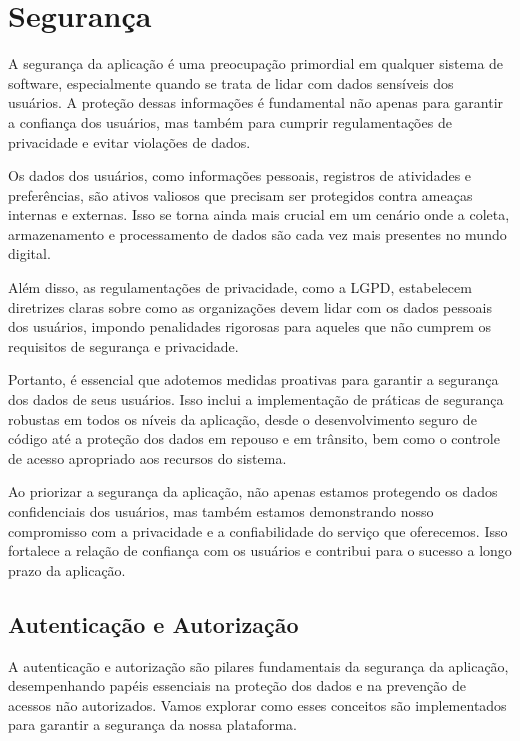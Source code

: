 \section{Segurança}

A segurança da aplicação é uma preocupação primordial em qualquer sistema de software, especialmente quando se trata de lidar com dados sensíveis dos usuários. A proteção dessas informações é fundamental não apenas para garantir a confiança dos usuários, mas também para cumprir regulamentações de privacidade e evitar violações de dados.

Os dados dos usuários, como informações pessoais, registros de atividades e preferências, são ativos valiosos que precisam ser protegidos contra ameaças internas e externas. Isso se torna ainda mais crucial em um cenário onde a coleta, armazenamento e processamento de dados são cada vez mais presentes no mundo digital.

Além disso, as regulamentações de privacidade, como a LGPD, estabelecem diretrizes claras sobre como as organizações devem lidar com os dados pessoais dos usuários, impondo penalidades rigorosas para aqueles que não cumprem os requisitos de segurança e privacidade.

Portanto, é essencial que adotemos medidas proativas para garantir a segurança dos dados de seus usuários. Isso inclui a implementação de práticas de segurança robustas em todos os níveis da aplicação, desde o desenvolvimento seguro de código até a proteção dos dados em repouso e em trânsito, bem como o controle de acesso apropriado aos recursos do sistema.

Ao priorizar a segurança da aplicação, não apenas estamos protegendo os dados confidenciais dos usuários, mas também estamos demonstrando nosso compromisso com a privacidade e a confiabilidade do serviço que oferecemos. Isso fortalece a relação de confiança com os usuários e contribui para o sucesso a longo prazo da aplicação.

\subsection{Autenticação e Autorização}

A autenticação e autorização são pilares fundamentais da segurança da aplicação, desempenhando papéis essenciais na proteção dos dados e na prevenção de acessos não autorizados. Vamos explorar como esses conceitos são implementados para garantir a segurança da nossa plataforma.

